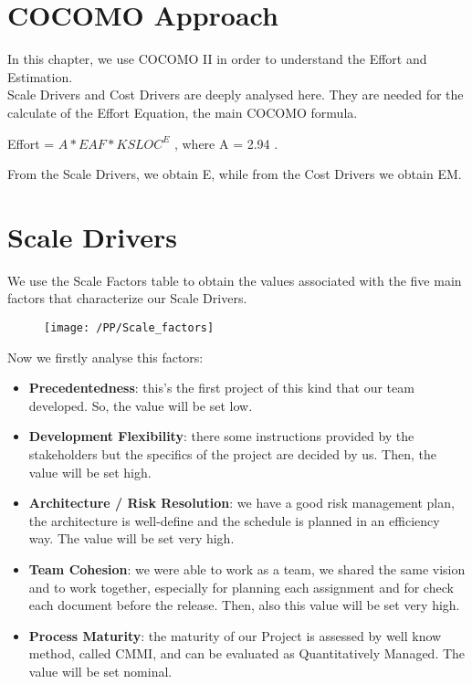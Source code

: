 \section{COCOMO Approach}
In this chapter, we use COCOMO II in order to understand the Effort and Estimation. 
\\Scale Drivers and Cost Drivers are deeply analysed here. They are needed for the calculate of the Effort Equation, the main COCOMO formula.
\\\begin{center} Effort = $A * EAF * KSLOC^E$  , where A = 2.94 . \end{center}
From the Scale Drivers, we obtain E, while from the Cost Drivers we obtain EM. 

\section{Scale Drivers}
We use the Scale Factors table to obtain the values associated with the five main factors that characterize our Scale Drivers. %
\begin{center}
\begin{figure}[!ht]
  \centering
  \vspace{0.2cm}
  \texttt{[image: /PP/Scale\_factors]}\\
  \vspace{0.2cm}
  \label{fig:scale_factors} 
\end{figure}
\end{center}

Now we firstly analyse this factors:
\begin{itemize}
    \item \textbf{Precedentedness}: this's the first project of this kind that our team developed. So, the value will be set low.
    \item \textbf{Development Flexibility}: there some instructions provided by the stakeholders but the specifics of the project are decided by us. Then, the value will be set high.
    \item \textbf{Architecture / Risk Resolution}: we have a good risk management plan, the architecture is well-define and the schedule is planned in an efficiency way. The value will be set very high. 
    \item \textbf{Team Cohesion}: we were able to work as a team, we shared the same vision and to work together, especially for planning each assignment and for check each document before the release. Then, also this value will be set very high.
    \item \textbf{Process Maturity}: the maturity of our Project is assessed by well know method, called CMMI, and can be evaluated as Quantitatively Managed. The value will be set nominal. 
\end{itemize}

